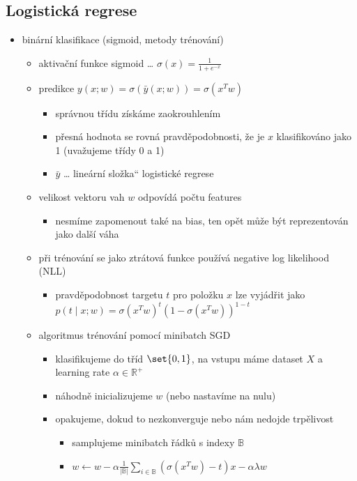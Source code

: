 \subsection{Logistická regrese}
\begin{itemize}
\item binární klasifikace (sigmoid, metody trénování)
\begin{itemize}
\item aktivační funkce sigmoid \dots{} $\sigma(x)=\frac1{1+e^{-x}}$
\item predikce $y(x;w)=\sigma(\bar y(x;w))=\sigma(x^Tw)$
\begin{itemize}
\item správnou třídu získáme zaokrouhlením
\item přesná hodnota se rovná pravděpodobnosti, že je $x$ klasifikováno jako 1 (uvažujeme třídy 0 a 1)
\item $\bar y$ \dots{} \quotedblbase{}lineární složka\textquotedblleft{} logistické regrese
\end{itemize}
\item velikost vektoru vah $w$ odpovídá počtu features
\begin{itemize}
\item nesmíme zapomenout také na bias, ten opět může být reprezentován jako další váha
\end{itemize}
\item při trénování se jako ztrátová funkce používá negative log likelihood (NLL)
\begin{itemize}
\item pravděpodobnost targetu $t$ pro položku $x$ lze vyjádřit jako $p(t\mid x;w)=\sigma(x^Tw)^{t}(1-\sigma(x^Tw))^{1-{t}}$
\end{itemize}
\item algoritmus trénování pomocí minibatch SGD
\begin{itemize}
\item klasifikujeme do tříd $\set{0,1}$, na vstupu máme dataset $X$ a learning rate $\alpha\in\mathbb R^+$
\item náhodně inicializujeme $w$ (nebo nastavíme na nulu)
\item opakujeme, dokud to nezkonverguje nebo nám nedojde trpělivost
\begin{itemize}
\item samplujeme minibatch řádků s indexy $\mathbb B$
\item $w\leftarrow w-\alpha\frac1{|\mathbb B|}\sum_{i\in \mathbb B}(\sigma(x^Tw)-t)x-\alpha\lambda w$
\begin{itemize}

\end{itemize}
\end{itemize}
\end{itemize}
\end{itemize}
\end{itemize}
